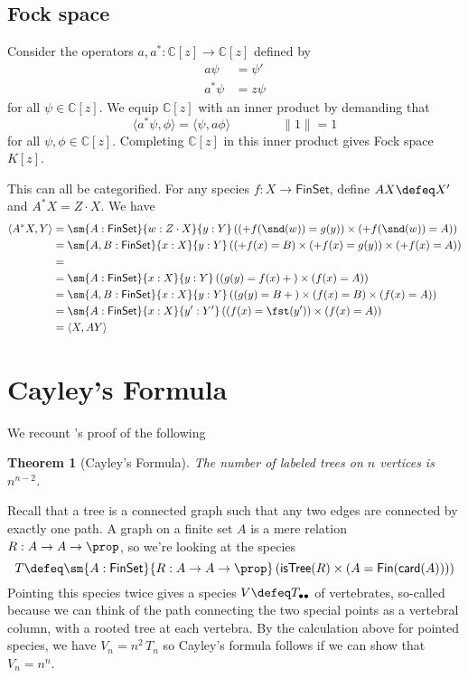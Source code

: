 \documentclass[fleqn]{article}
\newcommand{\card}{\mathsf{card}}
\newcommand{\fin}{\mathsf{Fin}}
\newcommand{\finset}{\mathsf{FinSet}}
\newcommand{\inner}[2]{\langle #1, #2 \rangle}
\theoremstyle{theorem}
\newtheorem{thm}{Theorem}
\theoremstyle{definition}
\begin{document}
\subsection{Fock space}
Consider the operators $a, a^{*} : \mathbb{C}[z] \to \mathbb{C}[z]$ defined by
\begin{align*}
  a\psi &= \psi' \\
  a^{*}\psi &= z\psi
\end{align*}
for all $\psi \in \mathbb{C}[z]$.  We equip $\mathbb{C}[z]$ with an inner
product by demanding that
\[
  \inner{a^{*}\psi}{\phi} = \inner{\psi}{a\phi}
  \qquad\qquad
  \lVert 1 \rVert = 1
\]
for all $\psi, \phi \in \mathbb{C}[z]$.  Completing $\mathbb{C}[z]$ in this
inner product gives Fock space $K[z]$.

This can all be categorified.  For any species $f : X \to \finset$, define $AX
\defeq X'$ and $A^{*}X = Z \cdot X$.  We have
\begin{align*}
  \inner{A^{*}X}{Y}
  &=
  \sm{A:\finset}{w : Z \cdot X}{y:Y}\left(
    (\unit + f(\snd(w)) = g(y)) \times (\unit + f(\snd(w)) = A)
  \right)
  \\&=
  \sm{A, B:\finset}{x:X}{y:Y}\left(
    (\unit + f(x) = B) \times (\unit + f(x) = g(y)) \times (\unit + f(x) = A)
  \right)
  \\&=
  \\&=
  \sm{A : \finset}{x:X}{y:Y}
  \left(
    (g(y) = f(x) + \unit) \times (f(x) = A)
  \right)
  \\&=
  \sm{A, B : \finset}{x:X}{y:Y}
  \left(
    (g(y) = B + \unit) \times (f(x) = B) \times (f(x) = A)
  \right)
  \\&=
  \sm{A : \finset}{x:X}{y' : Y'}\left(
    (f(x) = \fst(y')) \times (f(x) = A)
  \right)
  \\&=
  \inner{X}{AY}
\end{align*}





\section{Cayley's Formula}
We recount \citeauthor{Joyal1981}'s proof of the following
\begin{thm}[Cayley's Formula] 
  The number of labeled trees on $n$ vertices is $n^{n-2}$.
\end{thm}

Recall that a tree is a connected graph such that any two edges are connected
by exactly one path.  A graph on a finite set $A$ is a mere relation $R : A
\to A \to \prop$, so we're looking at the species
\[
  T \defeq \sm{A:\finset}{R : A \to A \to \prop}\left(
      \mathsf{isTree}(R) \times (A = \fin(\card(A)))
    \right)
\]
Pointing this species twice gives a species $V \defeq T_{\bullet\bullet}$ of
vertebrates, so-called because we can think of the path connecting the two
special points as a vertebral column, with a rooted tree at each vertebra.  By
the calculation above for pointed species, we have $V_{n} = n^{2}\, T_{n}$ so
Cayley's formula follows if we can show that $V_{n} = n^{n}$.
\end{document}
